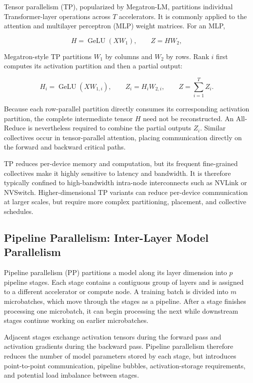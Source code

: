\documentclass[11pt,journal,final, onecolumn]{IEEEtran}
\begin{document}
Tensor parallelism (TP), popularized by Megatron-LM, partitions individual
Transformer-layer operations across \(T\) accelerators. It is commonly applied
to the attention and multilayer perceptron (MLP) weight matrices. For an MLP,

\[
    H = \operatorname{GeLU}(XW_1),
    \qquad
    Z = HW_2,
\]

Megatron-style TP partitions \(W_1\) by columns and \(W_2\) by rows. Rank \(i\)
first computes its activation partition and then a partial output:

\[
    H_i = \operatorname{GeLU}(XW_{1,i}),
    \qquad
    Z_i = H_iW_{2,i},
    \qquad
    Z = \sum_{i=1}^{T} Z_i.
\]

Because each row-parallel partition directly consumes its corresponding
activation partition, the complete intermediate tensor \(H\) need not be
reconstructed. An All-Reduce is nevertheless required to combine the partial
outputs \(Z_i\). Similar collectives occur in tensor-parallel attention,
placing communication directly on the forward and backward critical paths.

TP reduces per-device memory and computation, but its frequent fine-grained
collectives make it highly sensitive to latency and bandwidth. It is therefore
typically confined to high-bandwidth intra-node interconnects such as NVLink
or NVSwitch. Higher-dimensional TP variants can reduce per-device
communication at larger scales, but require more complex partitioning,
placement, and collective schedules.

\subsection{Pipeline Parallelism: Inter-Layer Model Parallelism}
\label{subsec:pipeline-parallelism}

Pipeline parallelism (PP) partitions a model along its layer dimension into
\(p\) pipeline stages. Each stage contains a contiguous group of layers and is
assigned to a different accelerator or compute node. A training batch is
divided into \(m\) microbatches, which move through the stages as a pipeline.
After a stage finishes processing one microbatch, it can begin processing the
next while downstream stages continue working on earlier microbatches.

Adjacent stages exchange activation tensors during the forward pass and
activation gradients during the backward pass. Pipeline parallelism therefore
reduces the number of model parameters stored by each stage, but introduces
point-to-point communication, pipeline bubbles, activation-storage
requirements, and potential load imbalance between stages.
\end{document}
